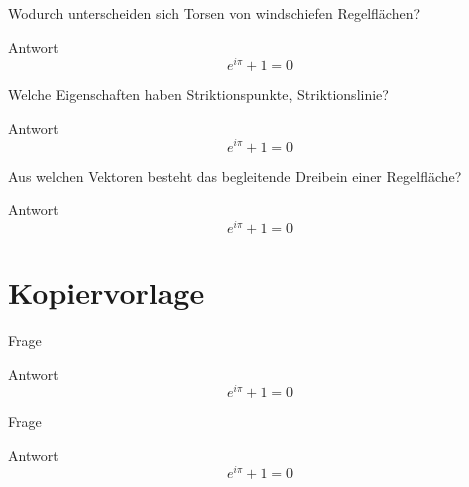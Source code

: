 \documentclass[twocolumn, fontsize=8pt, DIV=1]{scrartcl}
\begin{document}
\begin{framed}
    Wodurch unterscheiden sich Torsen von windschiefen Regelflächen?
\end{framed}
Antwort
\[
    e^{i\pi} + 1 = 0
\]



\begin{framed}
    Welche Eigenschaften haben Striktionspunkte, Striktionslinie?
\end{framed}
Antwort
\[
    e^{i\pi} + 1 = 0
\]



\begin{framed}
    Aus welchen Vektoren besteht das begleitende Dreibein einer Regelfläche?
\end{framed}
Antwort
\[
    e^{i\pi} + 1 = 0
\]



\section*{Kopiervorlage}

\begin{framed}
    Frage
\end{framed}
Antwort
\[
    e^{i\pi} + 1 = 0
\]



\begin{framed}
    Frage
\end{framed}
Antwort
\[
    e^{i\pi} + 1 = 0
\]



\listoftodos
\end{document}
